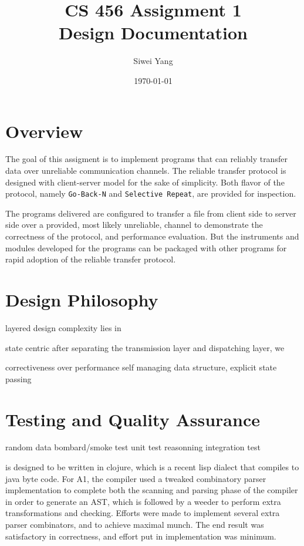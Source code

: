 \documentclass[12pt]{article}
\begin{document}
\title{CS 456 Assignment 1\\Design Documentation}
\date{\today}
\author{Siwei Yang}
\maketitle

\section{Overview}
The goal of this assigment is to implement programs that can reliably transfer data over unreliable communication channels. The reliable transfer protocol is designed with client-server model for the sake of simplicity. Both flavor of the protocol, namely \texttt{Go-Back-N} and \texttt{Selective Repeat}, are provided for inspection.

The programs delivered are configured to transfer a file from client side to server side over a provided, most likely unreliable, channel to demonstrate the correctness of the protocol, and performance evaluation. But the instruments and modules developed for the programs can be packaged with other programs for rapid adoption of the reliable transfer protocol.

\section{Design Philosophy}
layered design
complexity lies in

state centric
after separating the transmission layer and dispatching layer, we 

correctiveness over performance
self managing data structure, explicit state passing

\section{Testing and Quality Assurance}
random data bombard/smoke test
unit test
reasonning
integration test









is designed to be written in clojure, which
is a recent lisp dialect that compiles to java byte code. For A1, the compiler
used a tweaked combinatory parser implementation to complete both the scanning
and parsing phase of the compiler in order to generate an AST, which is followed
by a weeder to perform extra transformations and checking. Efforts were made to
implement several extra parser combinators, and to achieve maximal munch. The
end result was satisfactory in correctness, and effort put in implementation was
minimum.
\end{document}
